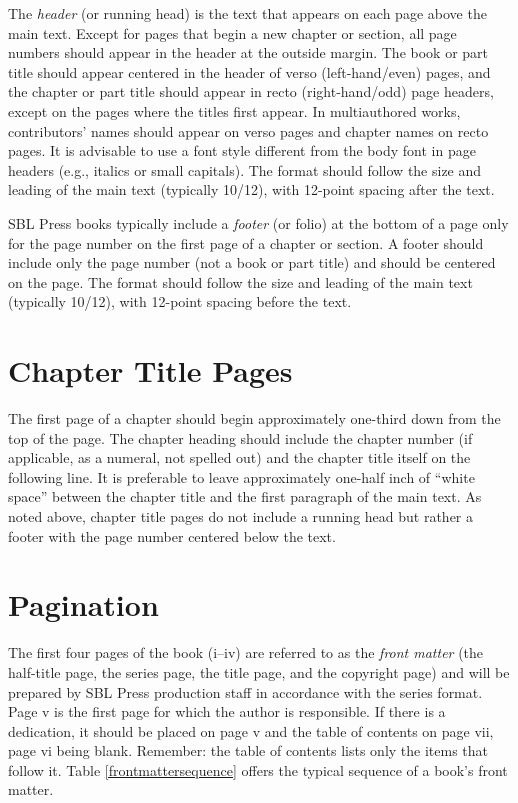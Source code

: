 \documentclass[sblidx={ancient sources, modern authors, subject}]{sblbook}
\begin{document}
%
The \emph{header} (or running head) is the text that appears on each page
above the main text. Except for pages that begin a new chapter or section, all
page numbers should appear in the header at the outside margin. The book or
part title should appear centered in the header of verso
(left-hand/even) pages, and the chapter or part title should appear in
recto (right-hand/odd) page headers, except on the pages where
the titles first appear. In multiauthored works, contributors’ names should
appear on verso pages and chapter names on recto
pages. It is advisable to use a font style different from the body font in
page headers (e.g., italics or small capitals). The format should follow the
size and leading of the main text (typically 10/12), with 12-point spacing
after the text.

SBL Press books typically include a \emph{footer} (or
folio) at the bottom of a page only for the page number on the first page of a
chapter or section. A footer should include only the page number (not a book
or part title) and should be centered on the page.  The format should follow
the size and leading of the main text
(typically 10/12), with 12-point spacing before the text.

\section{Chapter Title Pages}

%
The first page of a chapter should begin approximately one-third down from the
top of the page. The chapter heading should include the chapter number (if
applicable, as a numeral, not spelled out) and the chapter title itself on the
following line. It is preferable to leave approximately one-half inch of
“white space” between the chapter title and the first paragraph of the main
text. As noted above, chapter title pages do not include a running head but
rather a footer with the page number centered below the text.

\section{Pagination}

The first four pages of the book (i–iv) are referred to as the \emph{front
matter} (the half-title page, the series page, the title
page, and the copyright page) and will be prepared by SBL Press production staff in
accordance with the series format. Page v is the first page for which the
author is responsible. If there is a dedication, it should be placed on page v and the table of contents on
page vii, page vi being blank. Remember: the table of contents lists only the
items that follow it. Table \ref{frontmattersequence} offers the typical
sequence of a book’s front matter.
\end{document}
